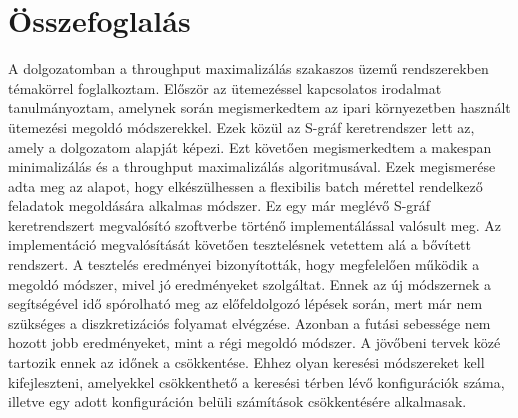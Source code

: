 \chapter{Összefoglalás}
A dolgozatomban a throughput maximalizálás szakaszos üzemű rendszerekben témakörrel foglalkoztam.
Először az ütemezéssel kapcsolatos irodalmat tanulmányoztam, amelynek során megismerkedtem az ipari környezetben használt ütemezési megoldó módszerekkel.
Ezek közül az S-gráf keretrendszer lett az, amely a dolgozatom alapját képezi.
Ezt követően megismerkedtem a makespan minimalizálás és a throughput maximalizálás algoritmusával.
Ezek megismerése adta meg az alapot, hogy elkészülhessen a flexibilis batch mérettel rendelkező feladatok megoldására alkalmas módszer.
Ez egy már meglévő S-gráf keretrendszert megvalósító szoftverbe történő implementálással valósult meg.
Az implementáció megvalósítását követően tesztelésnek vetettem alá a bővített rendszert.
A tesztelés eredményei bizonyították, hogy megfelelően működik a megoldó módszer, mivel jó eredményeket szolgáltat.
Ennek az új módszernek a segítségével idő spórolható meg az előfeldolgozó lépések során, mert már nem szükséges a diszkretizációs folyamat elvégzése.
Azonban a futási sebessége nem hozott jobb eredményeket, mint a régi megoldó módszer.
A jövőbeni tervek közé tartozik ennek az időnek a csökkentése.
Ehhez olyan keresési módszereket kell kifejleszteni, amelyekkel csökkenthető a keresési térben lévő konfigurációk száma, illetve egy adott konfiguráción belüli számítások csökkentésére alkalmasak.
